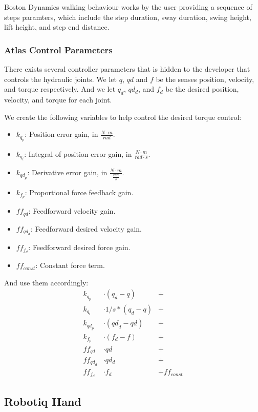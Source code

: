 \documentclass{article}
\begin{document}
Boston Dynamics walking behaviour works by the user providing a sequence of steps paramters, which include the step duration, sway duration, swing height, lift height, and step end distance.  




\subsubsection{Atlas Control Parameters}
There exists several controller parameters that is hidden to the developer that controls the hydraulic joints. We let $q$, $qd$ and $f$ be the senses position, velocity, and torque respectively. And we let $q_d$, $qd_d$, and $f_d$ be the desired position, velocity, and torque for each joint.

We create the following variables to help control the desired torque control:

\begin{itemize}
\item $k_{q_p}$: Position error gain, in $\frac{N \cdot m}{rad}$.
\item $k_{q_i} $: Integral of position error gain, in $\frac{N \cdot m}{rad \cdot s}$.
\item $k_{{qd}_p}$: Derivative error gain, in $\frac{N \cdot m}{\frac{rad}{s}}$.
\item $k_{f_p}$: Proportional force feedback gain.
\item ${ff}_{qd}$: Feedforward velocity gain.
\item ${ff}_{{qd}_d}$: Feedforward desired velocity gain.
\item ${ff}_{f_d}$: Feedforward desired force gain.
\item ${ff}_{const}$: Constant force term.
\end{itemize}

And use them accordingly: 
\begin{align*}
k_{q_p} &\cdot ( q_d - q ) &+\\
k_{q_i} &\cdot 1/s * ( q_d - q ) &+\\
k_{{qd}_p} &\cdot ( {qd}_d - qd ) &+\\
k_{f_p} &\cdot ( f_d - f ) &+\\
{ff}_{qd} &\cdot qd &+\\
{ff}_{{qd}_d} &\cdot qd_d &+\\
{ff}_{f_d} &\cdot f_d &+ {ff}_{const}
\end{align*}


\subsection{Robotiq Hand}
\end{document}
